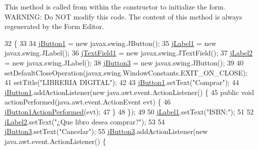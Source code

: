 This method is called from within the constructor to initialize the form. W\+A\+R\+N\+I\+NG\+: Do N\+OT modify this code. The content of this method is always regenerated by the Form Editor. 
\begin{DoxyCode}
32                                   \{
33 
34         \mbox{\hyperlink{class_interfaz_package_1_1_comprar_libro_add5c058f4090954bd33f186540441d18}{jButton1}} = \textcolor{keyword}{new} javax.swing.JButton();
35         \mbox{\hyperlink{class_interfaz_package_1_1_comprar_libro_a6f76d43eea40102ddff5d882389f306e}{jLabel1}} = \textcolor{keyword}{new} javax.swing.JLabel();
36         \mbox{\hyperlink{class_interfaz_package_1_1_comprar_libro_aefb13deeb30da3f6668b192b74c20705}{jTextField1}} = \textcolor{keyword}{new} javax.swing.JTextField();
37         \mbox{\hyperlink{class_interfaz_package_1_1_comprar_libro_ae3f9a64fb4e0e0131c4ccee88f410226}{jLabel2}} = \textcolor{keyword}{new} javax.swing.JLabel();
38         \mbox{\hyperlink{class_interfaz_package_1_1_comprar_libro_a911d2c0fd76d0d219563ebd3ddc851b0}{jButton3}} = \textcolor{keyword}{new} javax.swing.JButton();
39 
40         setDefaultCloseOperation(javax.swing.WindowConstants.EXIT\_ON\_CLOSE);
41         setTitle(\textcolor{stringliteral}{"LIBRERIA DIGITAL"});
42 
43         \mbox{\hyperlink{class_interfaz_package_1_1_comprar_libro_add5c058f4090954bd33f186540441d18}{jButton1}}.setText(\textcolor{stringliteral}{"Comprar"});
44         \mbox{\hyperlink{class_interfaz_package_1_1_comprar_libro_add5c058f4090954bd33f186540441d18}{jButton1}}.addActionListener(\textcolor{keyword}{new} java.awt.event.ActionListener() \{
45             \textcolor{keyword}{public} \textcolor{keywordtype}{void} actionPerformed(java.awt.event.ActionEvent evt) \{
46                 \mbox{\hyperlink{class_interfaz_package_1_1_comprar_libro_aebce4e6cc2e6631bb667ecf27132414a}{jButton1ActionPerformed}}(evt);
47             \}
48         \});
49 
50         \mbox{\hyperlink{class_interfaz_package_1_1_comprar_libro_a6f76d43eea40102ddff5d882389f306e}{jLabel1}}.setText(\textcolor{stringliteral}{"ISBN:"});
51 
52         \mbox{\hyperlink{class_interfaz_package_1_1_comprar_libro_ae3f9a64fb4e0e0131c4ccee88f410226}{jLabel2}}.setText(\textcolor{stringliteral}{"¿Que libro desea comprar?"});
53 
54         \mbox{\hyperlink{class_interfaz_package_1_1_comprar_libro_a911d2c0fd76d0d219563ebd3ddc851b0}{jButton3}}.setText(\textcolor{stringliteral}{"Cancelar"});
55         \mbox{\hyperlink{class_interfaz_package_1_1_comprar_libro_a911d2c0fd76d0d219563ebd3ddc851b0}{jButton3}}.addActionListener(\textcolor{keyword}{new} java.awt.event.ActionListener() \{

\end{DoxyCode}
